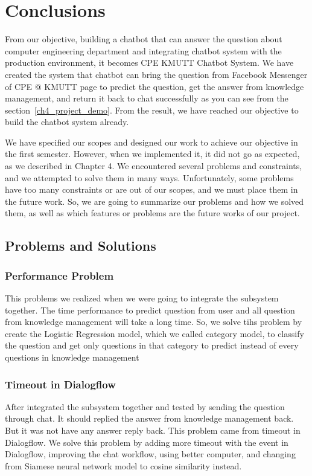 \documentclass[12pt,oneside,openright,a4paper]{cpe-english-project}
\begin{document}
\chapter{Conclusions}

From our objective, building a chatbot that can answer the question about computer engineering department
and integrating chatbot system with the production environment, it becomes CPE KMUTT Chatbot System.
We have created the system that chatbot can bring the question from Facebook Messenger of CPE @ KMUTT page
to predict the question, get the answer from knowledge management, and return it back to chat successfully
as you can see from the section~\ref*{ch4_project_demo}. %
From the result, we have reached our objective to build the chatbot system already.

We have specified our scopes and designed our work to achieve our objective in the first semester.
However, when we implemented it, it did not go as expected, as we described in Chapter 4.
We encountered several problems and constraints, and we attempted to solve them in many ways.
Unfortunately, some problems have too many constraints or are out of our scopes,
and we must place them in the future work.
So, we are going to summarize our problems and how we solved them,
as well as which features or problems are the future works of our project.

\section{Problems and Solutions}
\subsection{Performance Problem}
This problems we realized when we were going to integrate the subsystem together.
The time performance to predict question from user and all question from knowledge management
will take a long time. So, we solve tihs problem by create the Logistic Regression model,
which we called category model, to classify the question and get only questions in that
category to predict instead of every questions in knowledge management

\subsection{Timeout in Dialogflow}
\label{ch5_timeout_dialogflow}
After integrated the subsystem together and tested by sending the question through chat.
It should replied the answer from knowledge management back.
But it was not have any answer reply back. This problem came from timeout in Dialogflow.
We solve this problem by adding more timeout with the event in Dialogflow, improving the
chat workflow, using better computer,
and changing from Siamese neural network model to cosine similarity instead.
\end{document}
